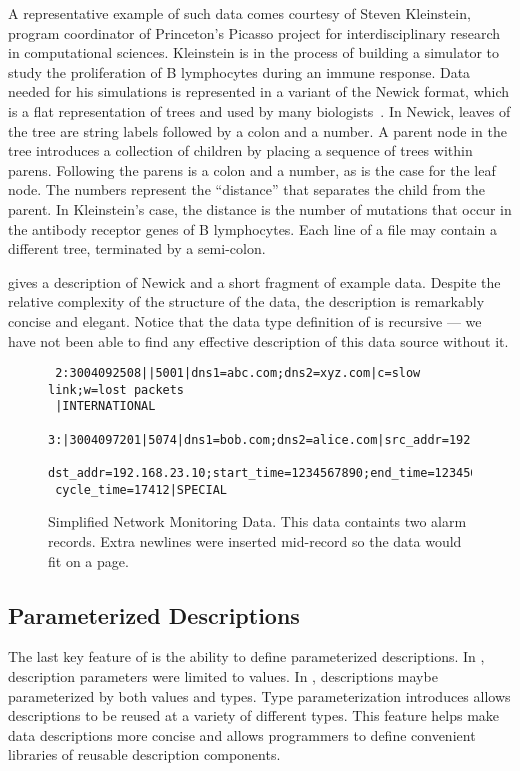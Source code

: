 A representative example of such data comes courtesy of Steven
Kleinstein, program coordinator of Princeton's Picasso project for
interdisciplinary research in computational sciences.  Kleinstein is
in the process of building a simulator to study the
proliferation of B lymphocytes during an immune response.  Data
needed for his simulations is represented in a variant of the
Newick format, which is a flat
representation of trees and used by 
many biologists~\cite{newick}.  In Newick, 
leaves of the tree are string labels followed by a colon and a number.
A parent node in the tree introduces a collection of children by
placing a sequence of trees within parens.  Following the parens is a
colon and a number, as is the case for the leaf node.
The numbers represent the ``distance'' 
that separates the child from the parent.  In
Kleinstein's case, the distance is the number of mutations that occur
in the antibody receptor genes of B lymphocytes.   Each line
of a file may contain a different tree, terminated by a semi-colon.

 gives a description of Newick and a short fragment 
of example data.  Despite the relative complexity of the structure of the data,
the description is remarkably concise and elegant.  Notice that the data type
definition of  is recursive --- we have not been able to find any
effective description of this data source without it.

\begin{figure}
  \centering
  \small
\begin{verbatim}
 2:3004092508||5001|dns1=abc.com;dns2=xyz.com|c=slow link;w=lost packets
 |INTERNATIONAL
 3:|3004097201|5074|dns1=bob.com;dns2=alice.com|src_addr=192.168.0.10;
 dst_addr=192.168.23.10;start_time=1234567890;end_time=1234568000;
 cycle_time=17412|SPECIAL
\end{verbatim}  
  \caption{Simplified Network Monitoring Data.  This 
data containts two alarm records.  Extra newlines 
were inserted mid-record so the data would fit on a page.}
  \label{fig:darkstar-records}
\end{figure}

\subsection{Parameterized Descriptions}

The last key feature of \datatype{} is the ability to define
parameterized descriptions.  In \pads, description parameters
were limited to values.  In \datatype, descriptions
maybe parameterized by both values and types.  Type parameterization
introduces allows descriptions to be
reused at a variety of different types.  This feature 
helps make data descriptions
more concise and allows programmers to define convenient libraries
of reusable description components.

